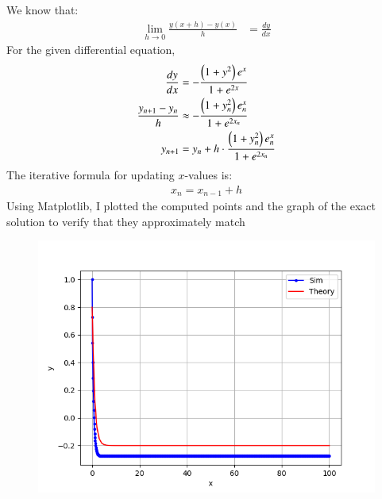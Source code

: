 \documentclass[journal]{IEEEtran}
\numberwithin{equation}{enumi}
\numberwithin{figure}{enumi}
\begin{document}
We know that:
\begin{align}
   \lim_{h \to 0} \frac{y(x+h) - y(x)}{h} &= \frac{dy}{dx} 
\end{align}
For the given differential equation,
\begin{align}
    \frac{dy}{dx}&=-\frac{\left(1+y^2\right)e^x}{1+e^{2x}}\\
    \frac{y_{n+1} - y_n}{h}&\approx -\frac{\left(1+y_n^2\right)e^x_n}{1+e^{2x_n}} \\
    y_{n+1} &= y_n + h \cdot \-\frac{\left(1+y_n^2\right)e^x_n}{1+e^{2x_n}}
\end{align}
The iterative formula for updating $x$-values is: 
\begin{align}
    x_n=x_{n-1}+h
\end{align}    
Using Matplotlib, I plotted the computed points and the graph of the exact solution to verify that they approximately match
\begin{figure}[h!]
	\centering
	\includegraphics[width=\columnwidth]{figs/Figure_1.png}
	\label{stemplot}
\end{figure}
\end{document}
